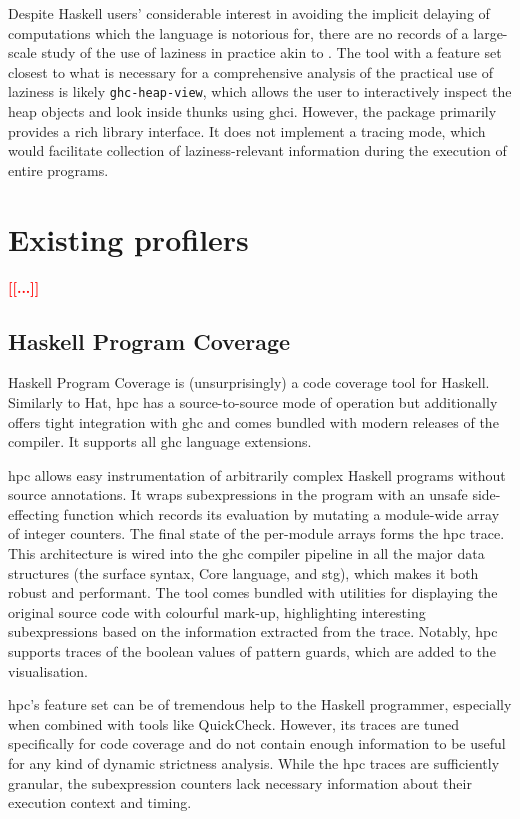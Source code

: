 \documentclass[thesis=B,english]{FITthesis}[2019/12/23]
\newcommand{\todo}[1]{\textcolor{red}{\textbf{[[#1]]}}}
\newcommand{\hackage}[1]{\texttt{#1}}
\begin{document}
Despite Haskell users' considerable interest in avoiding the implicit delaying
of computations which the language is notorious for, there are no records of a
large-scale study of the use of laziness in practice akin to
\cite{emp-study-laziness-r}. The tool with a feature set closest to what is
necessary for a comprehensive analysis of the practical use of laziness is
likely \hackage{ghc-heap-view}, which allows the user to interactively inspect
the heap objects and look inside thunks using \acrshort{ghci}. However, the
package primarily provides a rich library interface. It does not implement a
tracing mode, which would facilitate collection of laziness-relevant
information during the execution of entire programs.


\section{Existing profilers} \label{sec:existing-profilers}
\todo{...}

\subsection*{Haskell Program Coverage} \label{sec:hpc}
Haskell Program Coverage\cite{hpc-paper} is (unsurprisingly) a code coverage
tool for Haskell. Similarly to Hat, \acrshort{hpc} has a source-to-source mode
of operation but additionally offers tight integration with \acrshort{ghc} and
comes bundled with modern releases of the compiler. It supports all
\acrshort{ghc} language extensions.

\acrshort{hpc} allows easy instrumentation of arbitrarily complex Haskell
programs without source annotations. It wraps subexpressions in the program
with an unsafe side-effecting function which records its evaluation by mutating
a module-wide array of integer counters. The final state of the per-module
arrays forms the \acrshort{hpc} trace. This architecture is wired into the
\acrshort{ghc} compiler pipeline in all the major data structures (the surface
syntax, Core language, and \acrshort{stg}), which makes it both robust and
per\-for\-mant. The tool comes bundled with utilities for displaying the
original source code with colourful mark-up, highlighting interesting
subexpressions based on the information extracted from the trace. Notably,
\acrshort{hpc} supports traces of the boolean values of pattern guards, which
are added to the visualisation.

\acrshort{hpc}'s feature set can be of tremendous help to the Haskell
programmer, especially when combined with tools like
QuickCheck\cite{quickcheck-paper}. However, its traces are tuned specifically
for code coverage and do not contain enough information to be useful for any
kind of dynamic strictness analysis. While the \acrshort{hpc} traces are
sufficiently granular, the subexpression counters lack necessary information
about their execution context and timing.
\end{document}
